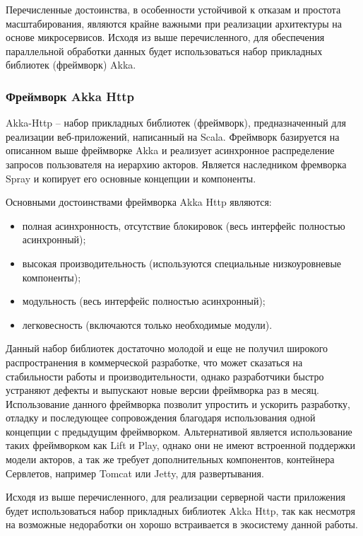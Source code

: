 Перечисленные достоинства, в особенности устойчивой к отказам и простота масштабирования, являются крайне важными при реализации архитектуры на основе микросервисов. Исходя из выше перечисленного, для обеспечения параллельной обработки данных будет использоваться набор прикладных библиотек (фреймворк) Akka.

\subsubsection{Фреймворк Akka Http}
\label{sec:techs:spray}

Akka-Http – набор прикладных библиотек (фреймворк), предназначенный для реализации веб-приложений, написанный на Scala. Фреймворк базируется на описанном выше фреймворке Akka и реализует асинхронное распределение запросов пользователя на иерархию акторов. Является наследником фремворка Spray и копирует его основные концепции и компоненты.

Основными достоинствами фреймворка Akka Http являются:
\begin{itemize}
  \item полная асинхронность, отсутствие блокировок (весь интерфейс полностью асинхронный);
  \item высокая производительность (используются специальные низкоуровневые компоненты);
  \item модульность (весь интерфейс полностью асинхронный);
  \item легковесность (включаются только необходимые модули).
\end{itemize}

Данный набор библиотек достаточно молодой и еще не получил широкого распространения в коммерческой разработке, что может сказаться на стабильности работы и производительности, однако разработчики быстро устраняют дефекты и выпускают новые версии фреймворка раз в месяц. Использование данного фреймворка позволит упростить и ускорить разработку, отладку и последующее сопровождения благодаря использования одной концепции с предыдущим фреймворком.
Альтернативой является использование таких фреймворком как Lift и Play, однако они не имеют встроенной поддержки модели акторов, а так же требует дополнительных компонентов, контейнера Сервлетов, например Tomcat или Jetty, для развертывания.

Исходя из выше перечисленного, для реализации серверной части приложения будет использоваться набор прикладных библиотек Akka Http, так как несмотря на возможные недоработки он хорошо встраивается в экосистему данной работы.

